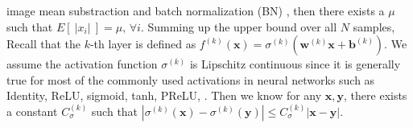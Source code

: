 \documentclass[10pt,twocolumn,letterpaper]{article}
\newtheorem{lemma}[theorem]{Lemma}
\def\mb{\mathbf}
\begin{document}
image mean substraction and batch normalization (BN) \cite{BN}, then there exists a $\mu$ such that $E[\ |x_i|\ ] = \mu,\, \forall i$. Summing up the upper bound over all $N$ samples, %
Recall that the $k$-th layer is defined as $f^{(k)}(\mb x)=\sigma^{(k)}(\mb w^{(k)}\mb x+\mb b^{(k)})$. We assume the activation function $\sigma^{(k)}$ is Lipschitz continuous since it is generally true for most of the commonly used activations in neural networks  such as Identity, ReLU, sigmoid, tanh, PReLU, \etc. Then we know for any $\mb x,\mb y$, there exists a constant $C_\sigma^{(k)}$ such that $|\sigma^{(k)}(\mb x)-\sigma^{(k)}(\mb y)|\le C_\sigma^{(k)}|\mb x-\mb y|$.
\end{document}

